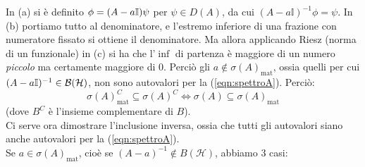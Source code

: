 \documentclass[../../FisicaTeorica.tex]{subfiles}
\begin{document}
In (a) si è definito $\phi = (A-a\mathbb{I})\psi$ per $\psi \in D\left(A\right)$, da cui $\left(A-a\mathbb{I}\right)^{-1}\phi =\psi$. In (b) portiamo tutto al denominatore, e l'estremo inferiore di una frazione con numeratore fissato si ottiene  il denominatore. Ma allora applicando Riesz (norma di un funzionale) in (c) si ha che l'$\inf$ di partenza è maggiore di un numero \textit{piccolo} ma certamente maggiore di $0$. Perciò gli $a \notin \sigma(A)_{\text{mat}}$, ossia quelli per cui $(A-a\mathbb{I})^{-1}\in\mathcal{B}(\mathcal{H})$, non sono autovalori per la (\ref{eqn:spettroA}). Perciò:
\[
\sigma(A)_{\text{mat}}^C \subseteq \sigma(A)^C \Leftrightarrow \sigma(A) \subseteq \sigma(A)_{\text{mat}}
\]
(dove $B^C$ è l'insieme complementare di $B$).\\
Ci serve ora dimostrare l'inclusione inversa, ossia che tutti gli autovalori  siano anche autovalori per la (\ref{eqn:spettroA}).\\
Se $a\in\sigma(A)_{\text{mat}}$, cioè se $\left(A-a\right)^{-1}\notin B\left(\mathcal{H}\right)$,  abbiamo 3 casi:
\end{document}

